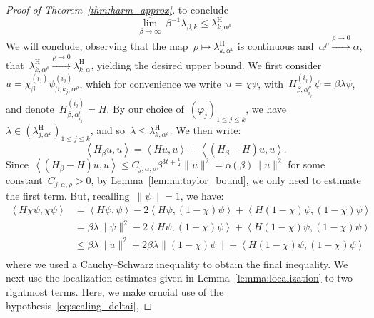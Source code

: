 \documentclass[10pt]{article}
\newcommand{\1}{\mathbbm 1}
\newcommand{\scalingExp}{t}
\newcommand{\shift}{\rho} %
\renewcommand{\o}{\mathrm{o}}
\begin{document}
\begin{proof}[Proof of Theorem~\ref{thm:harm_approx}]
        to conclude
        \[\underset{\beta\to\infty}{\overline\lim}\,\beta^{-1}\lambda_{\beta,k} \leq \lambda_{k,\alpha^\shift}^{\mathrm{H}}.\]
        We will conclude, observing that the map~$\shift\mapsto\lambda_{k,\alpha^\shift}^{\mathrm{H}}$ is continuous and~$\alpha^\shift \overset{\shift\to 0}{\longrightarrow} \alpha$, 
        that~$\lambda_{k,\alpha^\shift}^{\mathrm{H}}\overset{\shift\to 0}{\longrightarrow} \lambda_{k,\alpha}^{\mathrm H}$, yielding the desired upper bound.
        We first consider~$u = \chi_\beta^{(i_j)} \psi_{\beta,k_j,\alpha^\shift}^{(i_j)}$, which for convenience we write~$u=\chi\psi$, with~$H_{\beta,\alpha_{i_j}^\shift}^{(i_j)} \psi = \beta\lambda\psi$, and denote~$H_{\beta,\alpha_{i_j}^\shift}^{(i_j)}=H$.
        By our choice of~$(\varphi_j)_{1\leq j\leq k}$, we have~$\lambda \in (\lambda_{j,\alpha^\shift}^{\mathrm H})_{1\leq j\leq k}$, and so~$\lambda\leq \lambda_{k,\alpha^\shift}^{\mathrm H}$.
        We then write:
        \[\left\langle H_\beta u,u\right\rangle = \left\langle H u,u\right\rangle + \left\langle (H_\beta - H)u,u\right\rangle.\]
        Since~$\left\langle (H_\beta-H)u,u\right\rangle \leq C_{j,\alpha,\shift}\beta^{3\scalingExp+\frac12}\|u\|^2 = \mathrm{o}(\beta)\|u\|^2$ for some constant~$C_{j,\alpha,\shift}>0$, by Lemma~\ref{lemma:taylor_bound}, we only need to estimate the first term.
        But, recalling~$\|\psi\| = 1$, we have:
        \[\begin{aligned}
            \left\langle H\chi\psi,\chi\psi\right\rangle &= \left\langle H\psi,\psi\right\rangle - 2\left\langle H\psi,(1-\chi)\psi\right\rangle + \left\langle H(1-\chi)\psi,(1-\chi)\psi\right\rangle\\
            & = \beta\lambda\|\psi\|^2 - 2\left\langle H\psi,(1-\chi)\psi\right\rangle + \left\langle H(1-\chi)\psi,(1-\chi)\psi\right\rangle\\
            &\leq \beta\lambda\|u\|^2 + 2\beta\lambda\|(1-\chi)\psi\| + \left\langle H(1-\chi)\psi,(1-\chi)\psi\right\rangle\\
        \end{aligned}\]
        where we used a Cauchy--Schwarz inequality to obtain the final inequality.
        We next use the localization estimates given in Lemma~\ref{lemma:localization} to two rightmost terms. Here, we make crucial use of the hypothesis~\eqref{eq:scaling_deltai},

\end{proof}
\end{document}
